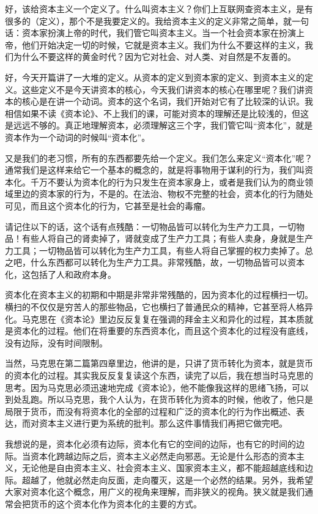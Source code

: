 \documentclass[UTF8, 12pt, a4paper]{ctexrep}
\begin{document}
好，该给资本主义一个定义了。什么叫资本主义？你们上互联网查资本主义，是有很多的（定义），那个不是我要定义的。我给资本主义的定义非常之简单，就一句话：资本家扮演上帝的时代，我们管它叫资本主义。当一个社会资本家在扮演上帝，他们开始决定一切的时候，它就是资本主义。我们为什么不要这样的主义，我们为什么不要这样的黄金时代？因为它对社会、对人类、对自然是不友善的。

好，今天开篇讲了一大堆的定义。从资本的定义到资本家的定义、到资本主义的定义。这些定义不是今天讲资本的核心，今天我们讲资本的核心在哪里呢？我们讲资本的核心是在讲一个动词。资本的这个名词，我们开始对它有了比较深的认识。我相信如果不读《资本论》、不上我们的课，可能对资本的理解还是比较浅的，但这是远远不够的。真正地理解资本，必须理解这三个字，我们管它叫“资本化”，就是资本作为一个动词的时候叫“资本化”。

又是我们的老习惯，所有的东西都要先给一个定义。我们怎么来定义“资本化”呢？通常我们是这样来给它一个基本的概念的，就是将事物用于谋利的行为，我们叫资本化。千万不要认为资本化的行为只发生在资本家身上，或者是我们认为的商业领域里边的资本家的行为，不是的。在法治、物权不完整的社会，资本化的行为随处可见，而且这个资本化的行为，它甚至是社会的毒瘤。

请记住以下的话，这个话有点残酷：一切物品皆可以转化为生产力工具，一切物品！有些人将自己的肾卖掉了，肾就变成了生产力工具；有些人卖身，身就是生产力工具；一切物品皆可以转化为生产力工具，有些人将自己掌握的权力卖掉了。总之吧，什么东西都可以转化为生产力工具。非常残酷，故，一切物品皆可以资本化，这包括了人和政府本身。

资本化在资本主义的初期和中期是非常非常残酷的，因为资本化的过程横扫一切。横扫的不仅仅是穷苦人的那些物品，它也横扫了普通民众的精神，它甚至将人格异化。马克思在《资本论》里边反反复复在强调的拜金主义和异化的过程，其本质就是资本化的过程。他们在将重要的东西资本化，而且这个资本化的过程没有底线，没有边际，没有时间限制。

当然，马克思在第二篇第四章里边，他讲的是，只讲了货币转化为资本，就是货币的资本化的过程。其实我反反复复读这个东西，读完了以后，我在想当时马克思的思考。因为马克思必须迅速地完成《资本论》，他不能像我这样的思绪飞扬，可以到处乱跑。所以马克思，我个人认为，在货币转化为资本的时候，他收了，他只是局限于货币，而没有将资本化的全部的过程和广泛的资本化的行为作出概述、表达，而对资本主义进行更为系统的批判。那么这件事情我们再把它做完吧。

我想说的是，资本化必须有边际，资本化有它的空间的边际，也有它的时间的边际。当资本化跨越边际之后，资本主义必然走向邪恶。无论是什么形态的资本主义，无论他是自由资本主义、社会资本主义、国家资本主义，都不能超越底线和边际。超越了，他就必然走向反面，走向覆灭，这是一个必然的结果。另外，我希望大家对资本化这个概念，用广义的视角来理解，而非狭义的视角。狭义就是我们通常会把货币的这个资本化作为资本化的主要的方式。
\end{document}
